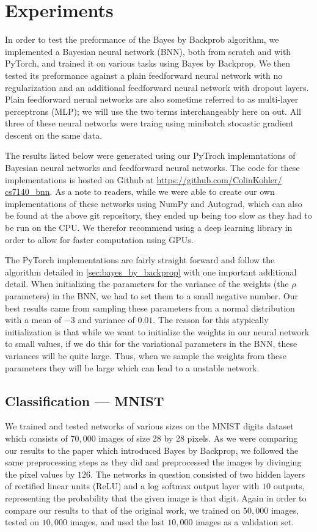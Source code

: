 \documentclass[11pt]{article}
\begin{document}
\section{Experiments}

In order to test the preformance of the Bayes by Backprob algorithm, we
implemented a Bayesian neural network (BNN), both from scratch and with PyTorch,
and trained it on various tasks using Bayes by Backprop. We then tested its
preformance against a plain feedforward neural network with no regularization
and an additional feedforward neural network with dropout layers. Plain 
feedforward nerual networks are also sometime referred to as multi-layer
perceptrons (MLP); we will use the two terms interchangeably here on out.
All three of these neural networks were traing using minibatch stocastic 
gradient descent on the same data.

The results listed below were generated using our PyTroch implemntations of 
Bayesian neural networks and feedforward neural networks. The code for these
implementations is hosted on Github at \url{https://github.com/ColinKohler/
cs7140_bnn}. As a note to readers, while we were able to create our own 
implementations of these networks using NumPy and Autograd, which can also
be found at the above git repository, they ended up being too slow as they had
to be run on the CPU\@. We therefor recommend using a deep learning library in
order to allow for faster computation using GPUs. 

The PyTorch implementations are fairly straight forward and follow the 
algorithm detailed in \cref{sec:bayes_by_backprop} with one important 
additional detail. When initializing the parameters for the variance of the 
weights (the $\rho$ parameters) in the BNN, we had to set them to a small
negative number. Our best results came from sampling these parameters from
a normal distribution with a mean of $-3$ and variance of $0.01$. The reason
for this atypically initialization is that while we want to initialize the
weights in our neural network to small values, if we do this for the 
variational parameters in the BNN, these variances will be quite large. Thus,
when we sample the weights from these parameters they will be large which can
lead to a unstable network.

\subsection{Classification --- MNIST}
We trained and tested networks of various sizes on the MNIST digits
dataset\cite{mnist} which consists of $70,000$ images of size 28 by 28 pixels.
As we were comparing our results to the paper which introduced Bayes by 
Backprop, we followed the same preprocessing steps as they did and 
preprocessed the images by divinging the pixel values by $126$. The networks
in question consisted of two hidden layers of rectified linear units (ReLU)
and a log softmax output layer with $10$ outputs, representing the probability
that the given image is that digit. Again in order to compare our results to
that of the original work, we trained on $50,000$ images, tested on
$10,000$ images, and used the last $10,000$ images as a validation set.
\end{document}
